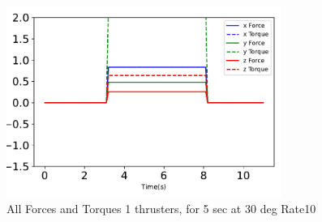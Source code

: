 \begin{figure}[htbp]\centerline{\includegraphics[width=0.8\textwidth]{AutoTeX/1Thrusters_5s_30deg_Loc2_Rate10}}\caption{All Forces and Torques 1 thrusters, for 5 sec at 30 deg Rate10}\label{fig:1Thrusters_5s_30deg_Loc2_Rate10}\end{figure}